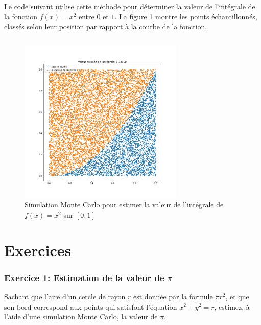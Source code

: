                 Le code suivant utilise cette méthode pour déterminer la valeur de l'intégrale de la fonction $f(x) = x^2$ entre $0$ et $1$. La figure \ref{fig:montecarlo_integral} montre les points échantillonnés, classés selon leur position par rapport à la courbe de la fonction.
                \inputminted{python}{codes/montecarlo_integral.py}
                \begin{figure}[ht!]
                    \centering
                    \includegraphics[width=0.7\textwidth]{images/montecarlo_integral.jpg}
                    \caption{Simulation Monte Carlo pour estimer la valeur de l'intégrale de $f(x)=x^2$ sur $[0, 1]$}
                    \label{fig:montecarlo_integral}
                \end{figure}
    
    \section{Exercices}
        \subsubsection{Exercice 1: Estimation de la valeur de $\pi$}
            Sachant que l'aire d'un cercle de rayon $r$ est donnée par la formule $\pi r^2$, et que son bord correspond aux points qui satisfont l'équation $x^2+y^2 = r$, estimez, à l'aide d'une simulation Monte Carlo, la valeur de $\pi$.

